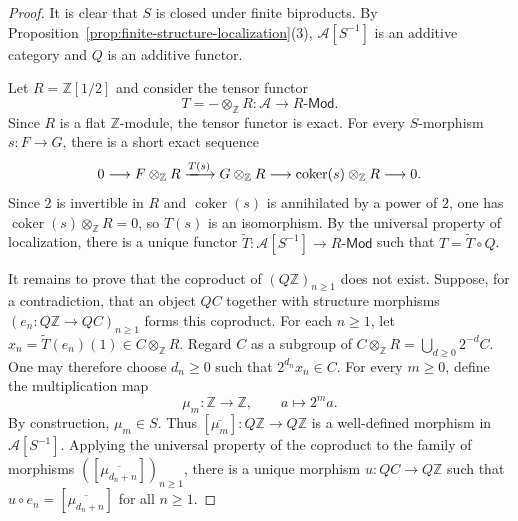 \documentclass[10pt,a4paper]{amsart}
\theoremstyle{plain}
\theoremstyle{definition}
\theoremstyle{remark}
\begin{document}
\begin{proof}
  It is clear that $S$ is closed under finite biproducts.
  By Proposition~\ref{prop:finite-structure-localization}(3), $\mathcal A[S^{-1}]$ is an additive category and $Q$ is an additive functor.

  \medskip

  Let $R=\mathbb Z[1/2]$ and consider the tensor functor
  \[
    T=-\otimes_{\mathbb Z}R:
    \mathcal A\longrightarrow R\text{-}\mathsf{Mod}.
  \]
  Since $R$ is a flat $\mathbb Z$-module, the tensor functor is exact.
  For every $S$-morphism $s:F\longrightarrow G$, there is a short exact sequence
  \[
    0\longrightarrow F\otimes_{\mathbb Z}R
    \xlongrightarrow{T(s)}G\otimes_{\mathbb Z}R
    \longrightarrow\operatorname{coker}(s)\otimes_{\mathbb Z}R
    \longrightarrow0.
  \]
  Since $2$ is invertible in $R$ and $\operatorname{coker}(s)$ is annihilated by a power of $2$, one has $\operatorname{coker}(s)\otimes_{\mathbb Z}R=0$, so $T(s)$ is an isomorphism.
  By the universal property of localization, there is a unique functor $\widetilde T:\mathcal A[S^{-1}]\longrightarrow R\text{-}\mathsf{Mod}$ such that $T=\widetilde T\circ Q$.

  \medskip

  It remains to prove that the coproduct of $(Q\mathbb Z)_{n\geq1}$ does not exist.
  Suppose, for a contradiction, that an object $QC$ together with structure morphisms $(e_n:Q\mathbb Z\longrightarrow QC)_{n \geq 1}$ forms this coproduct.
  For each $n\geq1$, let $x_n=\widetilde T(e_n)(1)\in C\otimes_{\mathbb Z}R$.
  Regard $C$ as a subgroup of $C\otimes_{\mathbb Z}R = \bigcup_{d\geq0}2^{-d}C$.
  One may therefore choose $d_n\geq0$ such that $2^{d_n}x_n\in C$.
  For every $m\geq0$, define the multiplication map
  \[
    \mu_m:\mathbb Z\longrightarrow\mathbb Z,
    \qquad a\longmapsto2^ma.
  \]
  By construction, $\mu_m\in S$.
  Thus $[\overline{\mu_m}] : Q\mathbb Z \longrightarrow Q\mathbb Z$ is a well-defined morphism in $\mathcal{A}[S^{-1}]$.
  Applying the universal property of the coproduct to the family of morphisms $([\overline{\mu_{d_n+n}}])_{n\geq1}$, there is a unique morphism $u:QC\longrightarrow Q\mathbb Z$ such that $u\circ e_n=[\overline{\mu_{d_n+n}}]$ for all $n \geq 1$.


\end{proof}
\end{document}
